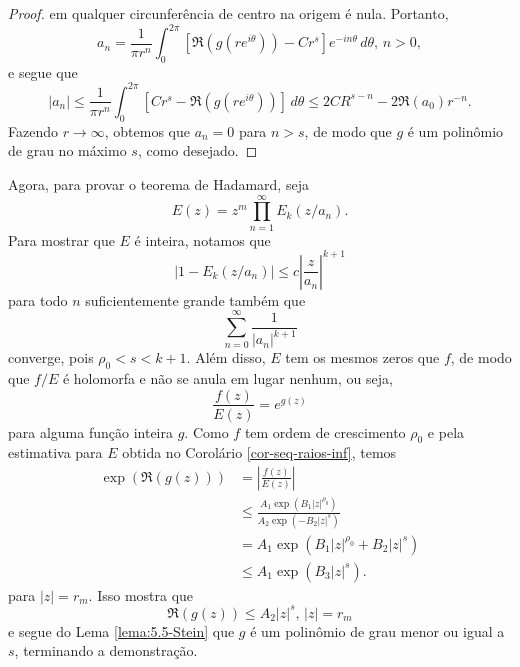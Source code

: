 \begin{proof}
        em qualquer circunferência de centro na origem é nula. Portanto,
        \begin{equation*}
            a_n 
            = 
            \frac{1}{\pi r^n} \int_0^{2\pi} \left[ \Re(g(re^{i\theta})) - Cr^s \right]e^{-in\theta}
            \, d\theta, \, n > 0,
        \end{equation*}
        e segue que
        \begin{equation*}
            |a_n| 
            \leq
            \frac{1}{\pi r^n} 
            \int_0^{2\pi} \left[ Cr^s - \Re(g(re^{i\theta})) \right] \, d\theta
            \leq
            2CR^{s-n} - 2\Re(a_0)r^{-n}.
        \end{equation*}
        Fazendo $r\to\infty$, obtemos que $a_n = 0$ para $n > s$, de modo que $g$
        é um polinômio de grau no máximo $s$, como desejado.
    \end{proof}
    
    \medskip
    
    Agora, para provar o teorema de Hadamard, seja
    \begin{equation*}
        E(z) = z^m \prod_{n=1}^{\infty} E_k(z/a_n).
    \end{equation*}
    Para mostrar que $E$ é inteira, notamos que
    \begin{equation*}
        |1 - E_k(z/a_n)| \leq c\left| \frac{z}{a_n} \right|^{k+1}
    \end{equation*}
    para todo $n$ suficientemente grande também que
    \begin{equation*}
        \sum_{n=0}^{\infty} \frac{1}{|a_n|^{k+1}}
    \end{equation*}
    converge, pois $\rho_0 < s < k+1$. Além disso, $E$ tem os mesmos zeros 
    que $f$, de modo que $f/E$ é holomorfa e não se anula em lugar nenhum,
    ou seja,
    \begin{equation*}
        \frac{f(z)}{E(z)} = e^{g(z)}
    \end{equation*}
    para alguma função inteira $g$. Como $f$ tem ordem de crescimento
    $\rho_0$ e pela estimativa para $E$ obtida no Corolário \ref{cor-seq-raios-inf},
    temos
    \begin{align*}
        \exp(\Re(g(z))) &= \left| \frac{f(z)}{E(z)} \right| \\
                        &\leq \frac{A_1 \exp( B_1|z|^{\rho_0} )}{A_2 \exp( -B_2|z|^{s} )} \\
                        &= A_1 \exp(B_1 |z|^{\rho_0} + B_2 |z|^s) \\
                        &\leq A_1 \exp(B_3 |z|^s).
    \end{align*}
    para $|z| = r_m$. Isso mostra que
    \begin{equation*}
        \Re(g(z)) \leq A_2|z|^s, \, |z| = r_m
    \end{equation*}
    e segue do Lema \ref{lema:5.5-Stein} que $g$ é um polinômio de grau menor
    ou igual a $s$, terminando a demonstração.
